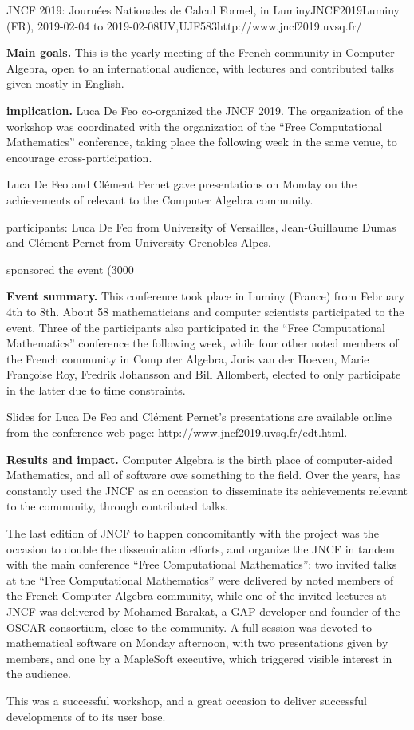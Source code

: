 \begin{event}{JNCF 2019: Journées Nationales de Calcul Formel, in Luminy}{JNCF2019}{Luminy (FR),
  2019-02-04 to
  2019-02-08}{UV,UJF}{58}{3}{http://www.jncf2019.uvsq.fr/}
  
\textbf{Main goals.} This is the yearly meeting of the French community in
Computer Algebra, open to an international audience, with lectures and
contributed talks given mostly in English.

\textbf{\ODK implication.} Luca De Feo co-organized the JNCF 2019. The
organization of the workshop was coordinated with the organization of
the ``Free Computational Mathematics'' conference, taking place the
following week in the same venue, to encourage cross-participation.

Luca De Feo and Clément Pernet gave presentations on Monday on the
achievements of \ODK relevant to the Computer Algebra
community.

\ODK participants: Luca De Feo from University of Versailles,
Jean-Guillaume Dumas and Clément Pernet from University Grenobles
Alpes.

\ODK sponsored the event (3000\euros %

\textbf{Event summary.} This conference took place in Luminy (France) from
February 4th to 8th. About 58 mathematicians and computer scientists
participated to the event. Three of the participants also participated
in the ``Free Computational Mathematics'' conference the following
week, while four other noted members of the French community in
Computer Algebra, Joris van der Hoeven, Marie Françoise Roy, Fredrik
Johansson and Bill Allombert, elected to only participate in the latter
due to time constraints.

Slides for Luca De Feo and Clément Pernet's presentations are
available online from the conference web page:
\url{http://www.jncf2019.uvsq.fr/edt.html}.

\textbf{Results and impact.} Computer Algebra is the birth place of
computer-aided Mathematics, and all of \ODK software owe something to
the field. Over the years, \ODK has constantly used the JNCF as an
occasion to disseminate its achievements relevant to the community,
through contributed talks.

The last edition of JNCF to happen concomitantly with the project was
the occasion to double the dissemination efforts, and organize the
JNCF in tandem with the main \ODK conference ``Free Computational
Mathematics'': two invited talks at the ``Free Computational
Mathematics'' were delivered by noted members of the French Computer
Algebra community, while one of the invited lectures at JNCF was
delivered by Mohamed Barakat, a GAP developer and founder of the OSCAR
consortium, close to the \ODK community. A full session was devoted to
mathematical software on Monday afternoon, with two presentations
given by \ODK members, and one by a MapleSoft executive, which
triggered visible interest in the audience.

This was a successful workshop, and a great occasion to deliver 
successful developments of \ODK to its user base.
\end{event}
